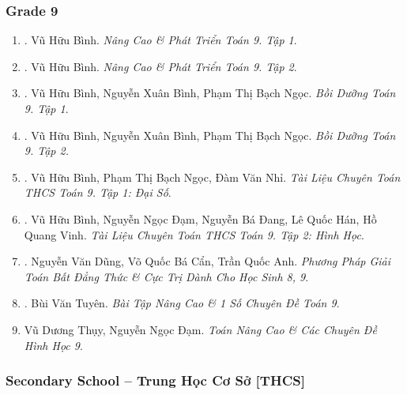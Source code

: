 \documentclass{article}
\begin{document}
\subsubsection{Grade 9}

\begin{enumerate}
	\item \cite{Binh_Toan_9_tap_1}. Vũ Hữu Bình. {\it Nâng Cao \& Phát Triển Toán 9. Tập 1}.\hfill{\sf[done]}
	\item \cite{Binh_Toan_9_tap_2}. Vũ Hữu Bình. {\it Nâng Cao \& Phát Triển Toán 9. Tập 2}.\hfill{\sf[done]}
	\item \cite{Binh_boi_duong_Toan_9_tap_1}. Vũ Hữu Bình, Nguyễn Xuân Bình, Phạm Thị Bạch Ngọc. {\it Bồi Dưỡng Toán 9. Tập 1}.\hfill{\sf[done]}
	\item \cite{Binh_boi_duong_Toan_9_tap_2}. Vũ Hữu Bình, Nguyễn Xuân Bình, Phạm Thị Bạch Ngọc. {\it Bồi Dưỡng Toán 9. Tập 2.}\hfill{\sf[done]}
	\item \cite{TLCT_THCS_Toan_9_dai_so}. Vũ Hữu Bình, Phạm Thị Bạch Ngọc, Đàm Văn Nhỉ. {\it Tài Liệu Chuyên Toán THCS Toán 9. Tập 1: Đại Số}.\hfill{\sf[done]}
	\item \cite{TLCT_THCS_Toan_9_hinh_hoc}. Vũ Hữu Bình, Nguyễn Ngọc Đạm, Nguyễn Bá Đang, Lê Quốc Hán, Hồ Quang Vinh. {\it Tài Liệu Chuyên Toán THCS Toán 9. Tập 2: Hình Học}.\hfill{\sf[done]}
	\item \cite{Dung_Can_Anh_BDT_8_9}. Nguyễn Văn Dũng, Võ Quốc Bá Cẩn, Trần Quốc Anh. {\it Phương Pháp Giải Toán Bất Đẳng Thức \& Cực Trị Dành Cho Học Sinh 8, 9}.\hfill{\sf[reading]}
	\item \cite{Tuyen_Toan_9_old}. Bùi Văn Tuyên. {\it Bài Tập Nâng Cao \& 1 Số Chuyên Đề Toán 9}.\hfill{\sf[done]}
	\item Vũ Dương Thụy, Nguyễn Ngọc Đạm. {\it Toán Nâng Cao \& Các Chuyên Đề Hình Học 9}.
\end{enumerate}

\subsubsection{Secondary School -- Trung Học Cơ Sở [THCS]}
\end{document}
